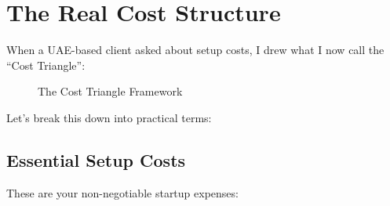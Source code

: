 \section{The Real Cost Structure}\label{sec:real-cost-structure}

When a UAE-based client asked about setup costs, I drew what I now call the ``Cost Triangle'':

\begin{figure}[h]
    \centering
    \caption{The Cost Triangle Framework}
    \label{fig:cost-triangle}
\end{figure}

Let's break this down into practical terms:

\subsection{Essential Setup Costs}\label{subsec:essential-setup-costs}
These are your non-negotiable startup expenses:


